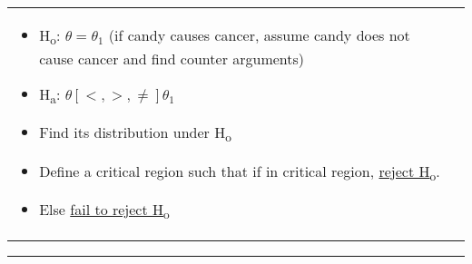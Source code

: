\documentclass[6pt]{article}
\newcommand{\HL}{\par\noindent\rule{\textwidth}{0.4pt}}
\begin{document}
\begin{footnotesize}
\begin{tabular}{l | l}
{\begin{flushright}
\begin{itemize}
\item H\textsubscript{o}: $\theta = \theta_{1}$ (if candy causes cancer, assume candy does not cause cancer and find counter arguments)
\item H\textsubscript{a}: $\theta [<,>,\ne] \theta_{1}$
\item Find its distribution under H\textsubscript{o}
\item Define a critical region such that if in critical region, \underline{reject H\textsubscript{o}}.
\item Else \underline{fail to reject H\textsubscript{o}}
\end{itemize}
\end{flushright}
}

\end{tabular}
\HL


\end{footnotesize}
\end{document}
